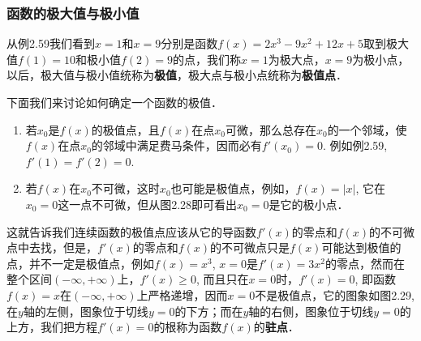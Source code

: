 \subsubsection{函数的极大值与极小值}

从例2.59我们看到$x=1$和$x=9$分别是函数$f(x)=2x^3-9x^2+12x+5$取到极大值$f(1)=10$和极小值$f(2)=9$的点，我们称$x=1$为极大点，$x=9$为极小点，以后，极大值与极小值统称为\textbf{极值}，极大点与极小点统称为\textbf{极值点}．

下面我们来讨论如何确定一个函数的极值．
\begin{enumerate}
    \item 若$x_0$是$f(x)$的极值点，且$f(x)$在点$x_0$可微，那么总存在$x_0$的一个邻域，使$f(x)$在点$x_0$的邻域中满足费马条件，因而必有$f'(x_0)=0$. 例如例2.59, $f'(1)=f' (2) =0$.
    \item 若$f(x)$在$x_0$不可微，这时$x_0$也可能是极值点，例如，$f(x)=|x|$, 它在$x_0=0$这一点不可微，但从图2.28即可看出$x_0=0$是它的极小点．
\end{enumerate}

\begin{figure}[htp]
    \centering
    \begin{minipage}[t]{0.48\textwidth}
    \centering
{}
    \caption{}
    \end{minipage}
    \begin{minipage}[t]{0.48\textwidth}
    \centering
    \caption{}
    \end{minipage}
    \end{figure}


这就告诉我们连续函数的极值点应该从它的导函数$f'(x)$的零点和$f(x)$的不可微点中去找，但是，$f'(x)$的零点和$f(x)$的不可微点只是$f(x)$可能达到极值的点，并不一定是极值点，例如$f(x)=x^3$, $x=0$是$f'(x)=3x^2$的零点，然而在整个区间$(-\infty,+\infty)$上，$f'(x)\ge 0$, 而且只在$x=0$时，$f'(x)=0$, 即函数$f(x)=x$在$(-\infty,+\infty)$上严格递增，因而$x=0$不是极值点，它的图象如图2.29, 在$y$轴的左侧，图象位于切线$y=0$的下方；而在$y$轴的右侧，图象位于切线$y=0$的上方，我们把方程$f'(x)=0$的根称为函数$f(x)$的\textbf{驻点}．

